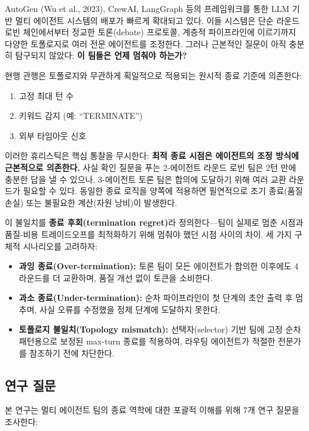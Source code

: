 \documentclass[a4paper,11pt]{article}
\begin{document}
AutoGen (Wu et al., 2023), CrewAI, LangGraph 등의 프레임워크를 통한 LLM 기반 멀티 에이전트 시스템의 배포가 빠르게 확대되고 있다. 이들 시스템은 단순 라운드 로빈 체인에서부터 정교한 토론(debate) 프로토콜, 계층적 파이프라인에 이르기까지 다양한 토폴로지로 여러 전문 에이전트를 조정한다. 그러나 근본적인 질문이 아직 충분히 탐구되지 않았다: \textbf{이 팀들은 언제 멈춰야 하는가?}

현행 관행은 토폴로지와 무관하게 획일적으로 적용되는 원시적 종료 기준에 의존한다:
\begin{enumerate}[label=(\roman*)]
    \item 고정 최대 턴 수
    \item 키워드 감지 (예: ``TERMINATE'')
    \item 외부 타임아웃 신호
\end{enumerate}

이러한 휴리스틱은 핵심 통찰을 무시한다: \textbf{최적 종료 시점은 에이전트의 조정 방식에 근본적으로 의존한다.} 사실 확인 질문을 푸는 2-에이전트 라운드 로빈 팀은 2턴 만에 충분한 답을 낼 수 있으나, 3-에이전트 토론 팀은 합의에 도달하기 위해 여러 교환 라운드가 필요할 수 있다. 동일한 종료 로직을 양쪽에 적용하면 필연적으로 조기 종료(품질 손실) 또는 불필요한 계산(자원 낭비)이 발생한다.

이 불일치를 \textbf{종료 후회(termination regret)}라 정의한다---팀이 실제로 멈춘 시점과 품질-비용 트레이드오프를 최적화하기 위해 멈춰야 했던 시점 사이의 차이. 세 가지 구체적 시나리오를 고려하자:

\begin{itemize}
    \item \textbf{과잉 종료(Over-termination):} 토론 팀이 모든 에이전트가 합의한 이후에도 4라운드를 더 교환하며, 품질 개선 없이 토큰을 소비한다.
    \item \textbf{과소 종료(Under-termination):} 순차 파이프라인이 첫 단계의 초안 출력 후 멈추며, 사실 오류를 수정했을 정제 단계에 도달하지 못한다.
    \item \textbf{토폴로지 불일치(Topology mismatch):} 선택자(selector) 기반 팀에 고정 순차 패턴용으로 보정된 max-turn 종료를 적용하여, 라우팅 에이전트가 적절한 전문가를 참조하기 전에 차단한다.
\end{itemize}

\subsection{연구 질문}

본 연구는 멀티 에이전트 팀의 종료 역학에 대한 포괄적 이해를 위해 7개 연구 질문을 조사한다:
\end{document}

